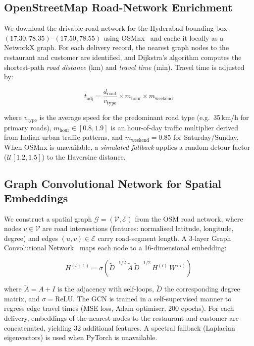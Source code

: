 \documentclass[conference]{IEEEtran}
\begin{document}
\subsection{OpenStreetMap Road-Network Enrichment}
\label{sec:osm}

We download the drivable road network for the Hyderabad bounding box
$(17.30, 78.35)$--$(17.50, 78.55)$ using OSMnx~\cite{boeing2017osmnx} and
cache it locally as a NetworkX graph.  For each delivery record, the nearest
graph nodes to the restaurant and customer are identified, and Dijkstra's
algorithm computes the shortest-path \textit{road distance} (km) and
\textit{travel time} (min).  Travel time is adjusted by:

\begin{equation}
    t_{\text{adj}} = \frac{d_{\text{road}}}{v_{\text{type}}} \times
        m_{\text{hour}} \times m_{\text{weekend}}
\end{equation}

where $v_{\text{type}}$ is the average speed for the predominant road type
(e.g.\ 35\,km/h for primary roads), $m_{\text{hour}} \in [0.8, 1.9]$ is an
hour-of-day traffic multiplier derived from Indian urban traffic
patterns, and $m_{\text{weekend}} = 0.85$ for Saturday/Sunday.
When OSMnx is unavailable, a \emph{simulated fallback} applies a random
detour factor ($\mathcal{U}[1.2, 1.5]$) to the Haversine distance.

\subsection{Graph Convolutional Network for Spatial Embeddings}
\label{sec:gnn}

We construct a spatial graph $\mathcal{G} = (\mathcal{V}, \mathcal{E})$ from
the OSM road network, where nodes $v \in \mathcal{V}$ are road intersections
(features: normalised latitude, longitude, degree) and edges
$(u,v) \in \mathcal{E}$ carry road-segment length.  A 3-layer Graph
Convolutional Network~\cite{kipf2017gcn} maps each node to a 16-dimensional
embedding:

\begin{equation}
    H^{(l+1)} = \sigma\!\left(
        \tilde{D}^{-1/2}\,\tilde{A}\,\tilde{D}^{-1/2}\,H^{(l)}\,W^{(l)}
    \right)
\end{equation}

where $\tilde{A} = A + I$ is the adjacency with self-loops,
$\tilde{D}$ the corresponding degree matrix, and $\sigma = \text{ReLU}$.
The GCN is trained in a self-supervised manner to regress edge travel times
(MSE loss, Adam optimiser, 200 epochs).  For each delivery, embeddings of the
nearest nodes to the restaurant and customer are concatenated, yielding
32 additional features.  A spectral fallback (Laplacian eigenvectors) is used
when PyTorch is unavailable.
\end{document}
